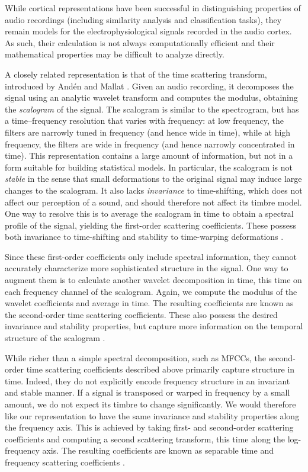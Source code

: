 \documentclass{bmcart}
\begin{document}
While cortical representations have been successful in distinguishing properties of audio recordings (including similarity analysis and classification tasks), they remain models for the electrophysiological signals recorded in the audio cortex.
As such, their calculation is not always computationally efficient and their mathematical properties may be difficult to analyze directly.

A closely related representation is that of the time scattering transform, introduced by And\'{e}n and Mallat \cite{anden2011multiscale,anden2014deep}.
Given an audio recording, it decomposes the signal using an analytic wavelet transform and computes the modulus, obtaining the \emph{scalogram} of the signal.
The scalogram is similar to the spectrogram, but has a time--frequency resolution that varies with frequency: at low frequency, the filters are narrowly tuned in frequency (and hence wide in time), while at high frequency, the filters are wide in frequency (and hence narrowly concentrated in time).
This representation contains a large amount of information, but not in a form suitable for building statistical models.
In particular, the scalogram is not \emph{stable} in the sense that small deformations to the original signal may induce large changes to the scalogram.
It also lacks \emph{invariance} to time-shifting, which does not affect our perception of a sound, and should therefore not affect its timbre model.
One way to resolve this is to average the scalogram in time to obtain a spectral profile of the signal, yielding the first-order scattering coefficients.
These possess both invariance to time-shifting and stability to time-warping deformations \cite{anden2014deep}.

Since these first-order coefficients only include spectral information, they cannot accurately characterize more sophisticated structure in the signal.
One way to augment them is to calculate another wavelet decomposition in time, this time on each frequency channel of the scalogram.
Again, we compute the modulus of the wavelet coefficients and average in time.
The resulting coefficients are known as the second-order time scattering coefficients.
These also possess the desired invariance and stability properties, but capture more information on the temporal structure of the scalogram \cite{anden2014deep}.

While richer than a simple spectral decomposition, such as MFCCs, the second-order time scattering coefficients described above primarily capture structure in time.
Indeed, they do not explicitly encode frequency structure in an invariant and stable manner.
If a signal is transposed or warped in frequency by a small amount, we do not expect its timbre to change significantly.
We would therefore like our representation to have the same invariance and stability properties along the frequency axis.
This is achieved by taking first- and second-order scattering coefficients and computing a second scattering transform, this time along the log-frequency axis.
The resulting coefficients are known as separable time and frequency scattering coefficients \cite{anden2014deep}.
\end{document}
